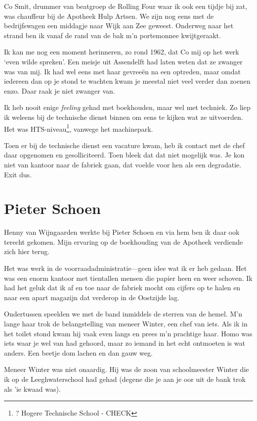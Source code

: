 \documentclass[12pt,twoside, openright]{memoir}
\begin{document}
Co Smit, drummer van beatgroep de Rolling Four waar ik ook een tijdje bij zat, was chauffeur bij de Apotheek Hulp Artsen. We zijn nog eens met de bedrijfswagen een middagje naar Wijk aan Zee geweest. Onderweg naar het strand ben ik vanaf de rand van de bak m’n portemonnee kwijtgeraakt.

Ik kan me nog een moment herinneren, zo rond 1962, dat Co mij op het werk `even wilde spreken'. Een meisje uit Assendelft had laten weten dat ze zwanger was van mij. Ik had wel eens met haar gevreeën na een optreden, maar omdat iedereen dan op je stond te wachten kwam je meestal niet veel verder dan zoenen enzo. Daar raak je niet zwanger van. 

Ik heb nooit enige \emph{feeling} gehad met boekhouden, maar wel met techniek. Zo liep ik weleens bij de technische dienst binnen om eens te kijken wat ze uitvoerden. Het was HTS-niveau\footnote{? Hogere Technische School - CHECK}, vanwege het machinepark. 

Toen er bij de technische dienst een vacature kwam, heb ik contact met de chef daar opgenomen en gesolliciteerd. Toen bleek dat dat niet mogelijk was. Je kon niet van kantoor naar de fabriek gaan, dat voelde voor hen als een degradatie. Exit dus.

\chapter{Pieter Schoen} %
\label{cha:schoen}

Henny van Wijngaarden werkte bij Pieter Schoen en via hem ben ik daar ook terecht gekomen. Mijn ervaring op de boekhouding van de Apotheek verdiende zich hier terug.

Het was werk in de voorraadadministratie---geen idee wat ik er heb gedaan. Het was een enorm kantoor met tientallen mensen die papier heen en weer schoven. Ik had het geluk dat ik af en toe naar de fabriek mocht om cijfers op te halen en naar een apart magazijn dat verderop in de Oostzijde lag. 

Ondertussen speelden we met de band inmiddels de sterren van de hemel. M’n lange haar trok de belangstelling van meneer Winter, een chef van iets. Als ik in het toilet stond kwam hij vaak even langs en prees m’n prachtige haar. Homo was iets waar je wel van had gehoord, maar zo iemand in het echt ontmoeten is wat anders. Een beetje dom lachen en dan gauw weg. 

Meneer Winter was niet onaardig. Hij was de zoon van schoolmeester Winter die ik op de Leeghwaterschool had gehad (degene die je aan je oor uit de bank trok als 'ie kwaad was). 
\end{document}
